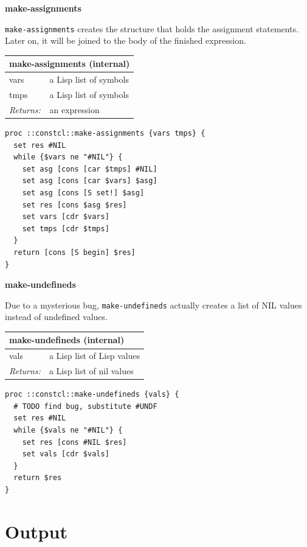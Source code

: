 \documentclass[twoside,9pt]{report}
\begin{document}
\textbf{make-assignments}


\texttt{make-assignments} creates the structure that holds the assignment statements. Later on, it will be joined to the body of the finished expression.

\begin{tabular}{ |l l| }
\hline
\multicolumn{2}{|l|}{make-assignments (internal)} \\
\hline
vars & a Lisp list of symbols \\
tmps & a Lisp list of symbols \\
\textit{Returns:} & an expression \\
\hline
\end{tabular}

\noindent\makebox[\linewidth]{\rule{\linewidth}{0.4pt}}
\begin{lstlisting}
proc ::constcl::make-assignments {vars tmps} {
  set res #NIL
  while {$vars ne "#NIL"} {
    set asg [cons [car $tmps] #NIL]
    set asg [cons [car $vars] $asg]
    set asg [cons [S set!] $asg]
    set res [cons $asg $res]
    set vars [cdr $vars]
    set tmps [cdr $tmps]
  }
  return [cons [S begin] $res]
}
\end{lstlisting}
\noindent\makebox[\linewidth]{\rule{\linewidth}{0.4pt}}

\textbf{make-undefineds}


Due to a mysterious bug, \texttt{make-undefineds} actually creates a list of NIL values instead of undefined values.

\begin{tabular}{ |l l| }
\hline
\multicolumn{2}{|l|}{make-undefineds (internal)} \\
\hline
vals & a Lisp list of Lisp values \\
\textit{Returns:} & a Lisp list of nil values \\
\hline
\end{tabular}

\noindent\makebox[\linewidth]{\rule{\linewidth}{0.4pt}}
\begin{lstlisting}
proc ::constcl::make-undefineds {vals} {
  # TODO find bug, substitute #UNDF
  set res #NIL
  while {$vals ne "#NIL"} {
    set res [cons #NIL $res]
    set vals [cdr $vals]
  }
  return $res
}
\end{lstlisting}
\noindent\makebox[\linewidth]{\rule{\linewidth}{0.4pt}}
\chapter{Output}
\label{output}
\end{document}
